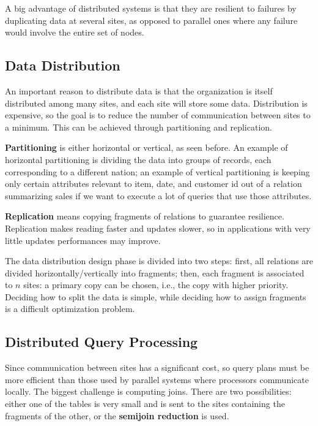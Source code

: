 A big advantage of distributed systems is that they are resilient to failures by duplicating data at several sites, as opposed to parallel ones where any failure would involve the entire set of nodes.

\subsection{Data Distribution}

An important reason to distribute data is that the organization is itself distributed among many sites, and each site will store some data. Distribution is expensive, so the goal is to reduce the number of communication between sites to a minimum. This can be achieved through partitioning and replication.

\textbf{Partitioning} is either horizontal or vertical, as seen before. An example of horizontal partitioning is dividing the data into groups of records, each corresponding to a different nation; an example of vertical partitioning is keeping only certain attributes relevant to item, date, and customer id out of a relation summarizing sales if we want to execute a lot of queries that use those attributes.

\textbf{Replication} means copying fragments of relations to guarantee resilience. Replication makes reading faster and updates slower, so in applications with very little updates performances may improve.

The data distribution design phase is divided into two steps: first, all relations are divided horizontally/vertically into fragments; then, each fragment is associated to $n$ sites: a primary copy can be chosen, i.e., the copy with higher priority. Deciding how to split the data is simple, while deciding how to assign fragments is a difficult optimization problem.

\subsection{Distributed Query Processing}

Since communication between sites has a significant cost, so query plans must be more efficient than those used by parallel systems where processors communicate locally. The biggest challenge is computing joins. There are two possibilities: either one of the tables is very small and is sent to the sites containing the fragments of the other, or the \textbf{semijoin reduction} is used.

